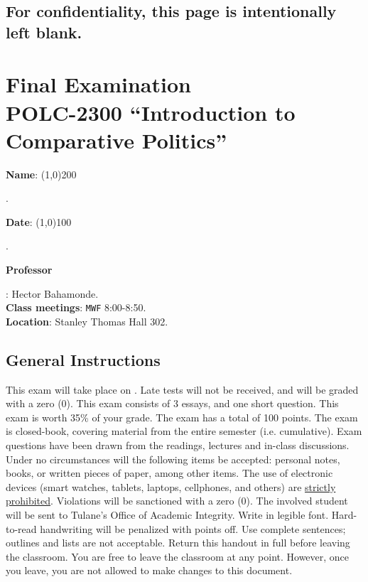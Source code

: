 \documentclass{article}
\begin{document}
\subsection*{For confidentiality, this page is intentionally left blank.}
\clearpage
\newpage


{\centering\section*{Final Examination\\POLC-2300 ``Introduction to Comparative Politics''}}

{\vspace{.5cm}\raggedright{\bf Name}: \line(1,0){200}}. %
{\vspace{.5cm}\hspace{4.5cm}\raggedright{\bf Date}: \line(1,0){100}}. %


{\vspace{.5cm}\raggedright \bf Professor}: Hector Bahamonde.\\
{\bf Class meetings}: \texttt{MWF} 8:00-8:50.\\
{\bf Location}: Stanley Thomas Hall 302.


\vspace{0.5cm}\subsection*{General Instructions}

This exam will take place on {\bf {\unskip}}. Late tests will not be received, and will be graded with a zero (0). This exam consists of 3 essays, and one short question. This exam is worth 35\% of your grade. The exam has a total of 100 points. The exam is closed-book, covering material from the entire semester (i.e. cumulative). Exam questions have been drawn from the readings, lectures and in-class discussions. Under no circumstances will the following items be accepted: personal notes, books, or written pieces of paper, among other items. The use of electronic devices (smart watches, tablets, laptops, cellphones, and others) are \underline{strictly prohibited}. Violations will be sanctioned with a zero (0). The involved student will be sent to Tulane's Office of Academic Integrity. Write in legible font.  Hard-to-read handwriting will be penalized with points off. Use complete sentences; outlines and lists are not acceptable. Return this handout in full before leaving the classroom. You are free to leave the classroom at any point. However, once you leave, you are not allowed to make changes to this document.
\clearpage
\newpage
\end{document}
